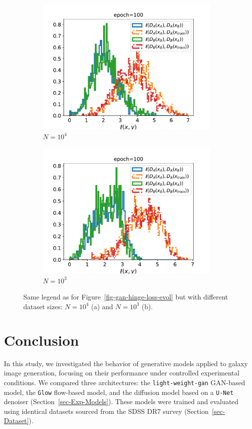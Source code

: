 \documentclass[fleqn,usenatbib]{mnras}
\begin{document}
\begin{figure}
    \centering
        \begin{subfigure}[b]{\columnwidth}
        \centering
        \includegraphics[width=0.8\linewidth]{fig-gan-loss_discri_10000_A_B_num_100.pdf}
        \caption{$N=10^4$}
        \end{subfigure}%
    \hfill
        \begin{subfigure}[b]{\columnwidth}
        \centering
        \includegraphics[width=0.8\linewidth]{fig-gan-loss_discri_1000_A_B_num_100.pdf}
        \caption{$N=10^3$}
        \end{subfigure}%
	\caption{Same legend as for Figure~\ref{fig-gan-hinge-loss-evol} but with different dataset sizes: $N=10^4$ (a) and $N=10^3$ (b).}
	\label{fig-gan-hinge-loss-epoch100-ntrain-10p3-10p4}
\end{figure}
%
\section{Conclusion}
\label{sec-conclusion}
%
In this study, we investigated the behavior of generative models applied to galaxy image generation, focusing on their performance under controlled experimental conditions. We compared three architectures: the \texttt{light-weight-gan} GAN-based model, the \texttt{Glow} flow-based model, and the diffusion model based on a \texttt{U-Net} denoiser (Section~\ref{sec-Exp-Models}). These models were trained and evaluated using identical datasets sourced from the SDSS DR7 survey (Section~\ref{sec-Dataset}).
\end{document}
